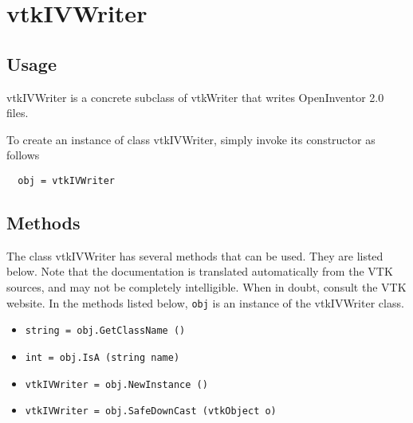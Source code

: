 \section{vtkIVWriter}

\subsection{Usage}

 vtkIVWriter is a concrete subclass of vtkWriter that writes OpenInventor 2.0
 files.


To create an instance of class vtkIVWriter, simply
invoke its constructor as follows
\begin{verbatim}
  obj = vtkIVWriter
\end{verbatim}
\subsection{Methods}

The class vtkIVWriter has several methods that can be used.
  They are listed below.
Note that the documentation is translated automatically from the VTK sources,
and may not be completely intelligible.  When in doubt, consult the VTK website.
In the methods listed below, \verb|obj| is an instance of the vtkIVWriter class.
\begin{itemize}
\item  \verb|string = obj.GetClassName ()|

\item  \verb|int = obj.IsA (string name)|

\item  \verb|vtkIVWriter = obj.NewInstance ()|

\item  \verb|vtkIVWriter = obj.SafeDownCast (vtkObject o)|

\end{itemize}
